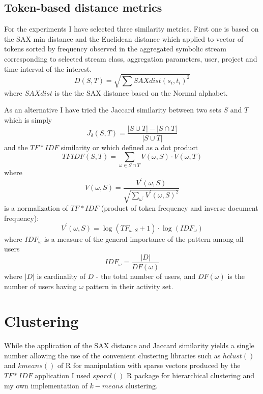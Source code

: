 \documentclass[10pt, conference, compsocconf]{IEEEtran}
\begin{document}
\subsection{Token-based distance metrics}
For the experiments I have selected three similarity metrics. 
First one is based on the SAX min distance and the Euclidean distance which applied to vector of tokens 
sorted by frequency observed in the aggregated symbolic stream corresponding to selected stream class,
aggregation parameters, user, project and time-interval of the interest. 
\begin{equation}
D(S,T) = \sqrt{ \sum SAXdist(s_{i},t_{i})^{2} }
\end{equation} 
where $SAXdist$ is the the SAX distance based on the Normal alphabet.

As an alternative I have tried the Jaccard similarity between two sets $S$ and $T$ which is simply 
\begin{equation}
J_{\delta}(S,T) = \frac{|S\cup T| - |S\cap T|}{|S\cup T|}
\end{equation} 
and the $TF\ast IDF$ similarity or which defined as a dot product 
\begin{equation}
 TFIDF(S,T) = \sum_{\omega \in S \cap T} V(\omega, S) \cdot V(\omega, T)
\end{equation} 
where 
\begin{equation}
 V(\omega, S) = \frac { V^{\prime} (\omega,S) } { \sqrt{ \sum_{\omega^{\prime}} V^{\prime} (\omega,S)^{2}} }
\end{equation} 
is a normalization of $TF\ast IDF$ (product of token frequency and inverse document frequency):
\begin{equation}
 V^{\prime} (\omega,S) = \log(TF_{\omega, S} +1) \cdot \log(IDF_{\omega})
\end{equation} 
where $IDF_{\omega}$ is a measure of the general importance of the pattern among all users
\begin{equation}
 IDF_{\omega} = \frac{|D|}{DF(\omega)}
\end{equation} 
where $|D|$ is cardinality of $D$ - the total number of users, and $DF(\omega)$ is the number of users having $\omega$ pattern in their activity set.

\section{Clustering}
While the application of the SAX distance and Jaccard similarity yields a single number allowing
the use of the convenient clustering libraries such as $hclust()$ and $kmeans()$ of R for manipulation
with sparse vectors produced by the $TF\ast IDF$ application I used $sparcl()$ R package for hierarchical
clustering and my own implementation of $k-means$ clustering.
\end{document}
